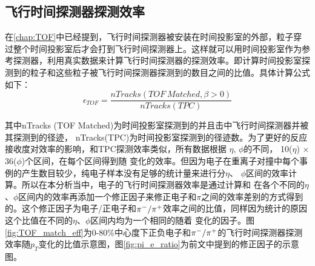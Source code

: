 \subsection{飞行时间探测器探测效率}
在\ref{chap:TOF}中已经提到，飞行时间探测器被安装在时间投影室的外部，粒子穿过整个时间投影室后才会打到飞行时间探测器上。这样就可以用时间投影室作为参考探测器，利用真实数据来计算飞行时间探测器的探测效率。即计算时间投影室探测到的粒子和这些粒子被飞行时间探测器探测到的数目之间的比值。具体计算公式如下：
\begin{equation}
    \epsilon_{TOF} = \frac{ nTracks(TOF~Matched, \beta > 0) }{ nTracks(TPC) }
\end{equation}

其中nTracks (TOF Matched)为时间投影室探测到的并且击中飞行时间探测器并被其探测到的径迹， nTracks(TPC)为时间投影室探测到的径迹数。为了更好的反应接收度对效率的影响，和TPC探测效率类似，所有数据根据 $\eta$, $\phi$的不同， 10($\eta$) $\times$ 36($\phi$)个区间，在每个区间得到随 \pt 变化的效率。但因为电子在重离子对撞中每个事例的产生数目较少，纯电子样本没有足够的统计量来进行分$\eta$、 $\phi$区间的效率计算。所以在本分析当中，电子的飞行时间探测器效率是通过计算\piplus 和 \piminus 在各个不同的$\eta$、$\phi$区间内的效率再添加一个修正因子来修正电子和$\pi$之间的效率差别的方式得到的。这个修正因子为电子/正电子和$\rm{\pi^- / \pi^+}$效率之间的比值，同样因为统计的原因这个比值在不同的$\eta$、$\phi$区间内均为一个相同的随着 \pt 变化的因子。图\ref{fig:TOF_match_eff}为0-80\%中心度下正负电子和$\rm{\pi^- / \pi^+}$的飞行时间探测器探测效率随$p_T$变化的比值示意图，图\ref{fig:pi_e_ratio}为前文中提到的修正因子的示意图。

